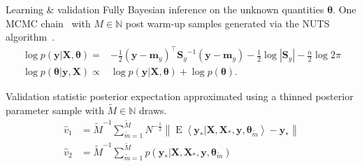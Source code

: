 \documentclass[final]{beamer}
\newcommand{\norm}[1]{\left\lVert#1\right\rVert}
\DeclareMathOperator{\evsym}{E}
\newcommand\EE[1]{\evsym\left\langle#1\right\rangle}
\begin{document}
\begin{frame}[t]
{\begin{minipage}[t][76cm][t]{58cm}
{\begin{minipage}[t][20cm][t]{28cm}
          \begin{block}{Learning \& validation}
            Fully Bayesian inference on the unknown quantities $\bm{\theta}$.
            One MCMC chain~\citep{raftery1992} with $M \in \mathbb{N}$ post warm-up
            samples generated via the NUTS algorithm~\citep{hoffman2014}.
            \begin{align}
              \label{eq:margina-likelihood}
              \log p(\mathbf{y} | \mathbf{X}, \bm{\theta})
              =& -\frac{1}{2}
                 {(\mathbf{y} - \mathbf{m}_y)}^\top
                 {\mathbf{S}_y}^{-1}
                 {(\mathbf{y} - \mathbf{m}_y)}
                 -\frac{1}{2}
                 \log | \mathbf{S}_y |
                 - \frac{n}{2} \log 2\pi \\
              \label{eq:parameter-posterior}
              \log p(\bm{\theta} | \mathbf{y}, \mathbf{X})
              \propto&
                       \log p(\mathbf{y} | \mathbf{X}, \bm{\theta}) +
                       \log p(\bm{\theta}).
            \end{align}

            Validation statistic posterior expectation approximated using a thinned
            posterior parameter sample with $\tilde{M} \in \mathbb{N}$ draws.
            \begin{align}
              \hat{v}_1
              &= {\tilde{M}}^{-1} \sum_{{\tilde{m}}=1}^{{\tilde{M}}} N^{-\frac{1}{2}} \norm{%
                \EE{\bm{y}_{*} | \bm{X}, \bm{X}_{*}, \bm{y}, {\bm{\theta}}_{{\tilde{m}}}} -
                \bm{y}_{*}
                } \label{eq:validation-rmse} \\
              \hat{v}_2
              &= {\tilde{M}}^{-1} \sum_{{\tilde{m}}=1}^{{\tilde{M}}}
                p(\bm{y}_{*} | \bm{X}, \bm{X}_{*}, \bm{y},
                {\bm{\theta}}_{{\tilde{m}}}) \label{eq:validation-ppld}
            \end{align}
          \end{block}


\end{minipage}}
\end{minipage}}
\end{frame}
\end{document}
